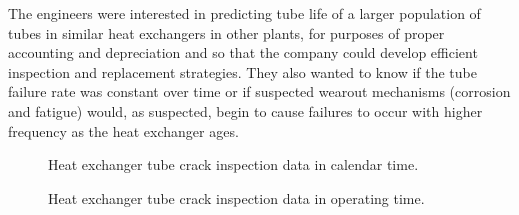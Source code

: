 \begin{example}
The engineers were interested in predicting tube life of a larger
population of tubes in similar heat exchangers in other plants, for
purposes of proper accounting and depreciation and so that the company
could develop efficient inspection and replacement strategies.  They
also wanted to know if the tube failure rate was constant over time or
if suspected wearout mechanisms (corrosion and fatigue) would, as
suspected, begin 
to cause failures to occur with higher frequency 
as the heat exchanger ages.
\begin{figure}
\caption{Heat exchanger tube crack inspection data in calendar time.}
\label{figure:heatex.year.datafig.ps}
\end{figure}
\begin{figure}
\caption{Heat exchanger tube crack inspection data in operating time.}
\label{figure:heatex.stime.datafig.ps}
\end{figure}
\end{example}

